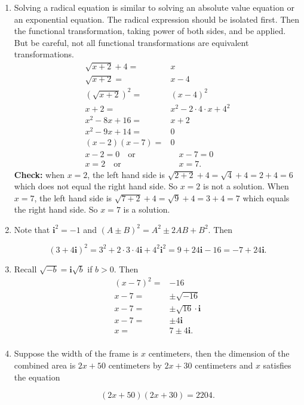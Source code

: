 \documentclass[
  12pt]{article}
\begin{document}
\begin{enumerate}
\def\labelenumi{\arabic{enumi}.}
\setcounter{enumi}{12}
\item
  Solving a radical equation is similar to solving an absolute value
  equation or an exponential equation. The radical expression should be
  isolated first. Then the functional transformation, taking power of
  both sides, and be applied. But be careful, not all functional
  transformations are equivalent transformations. \[
  \begin{aligned}
  \sqrt{x+2}+4=&x\\
  \sqrt{x+2}=&x-4\\
  (\sqrt{x+2})^2=&(x-4)^2\\
  x+2=&x^2-2\cdot 4\cdot x+4^2\\
  x^2-8x+16=&x+2\\
  x^2-9x+14=&0\\
  (x-2)(x-7)=&0\\
  x-2=0\quad\text{or}&\quad x-7=0\\
  x=2\quad\text{or}&\quad x=7.
  \end{aligned}
  \] \textbf{Check:} when \(x=2\), the left hand side is
  \(\sqrt{2+2}+4=\sqrt{4}+4=2+4=6\) which does not equal the right hand
  side. So \(x=2\) is not a solution. When \(x=7\), the left hand side
  is \(\sqrt{7+2}+4=\sqrt{9}+4=3+4=7\) which equals the right hand side.
  So \(x=7\) is a solution.
\item
  Note that \(\mathbf{i}^2=-1\) and \((A\pm B)^2=A^2\pm 2AB+B^2\). Then

  \[(3+4\mathbf{i})^2=3^2+2\cdot 3\cdot 4\mathbf{i}+4^2\mathbf{i}^2=9+24\mathbf{i}-16=-7+24\mathbf{i}.\]
\item
  Recall \(\sqrt{-b}=\mathbf{i}\sqrt{b}\) if \(b>0\). Then \[
  \begin{aligned}
  (x-7)^2=&-16\\
  x-7=&\pm\sqrt{-16}\\
  x-7=&\pm\sqrt{16}\cdot\mathbf{i}\\
  x-7=&\pm4\mathbf{i}\\
  x=&7\pm4\mathbf{i}.\\
  \end{aligned}
  \]
\item
  Suppose the width of the frame is \(x\) centimeters, then the
  dimension of the combined area is \(2x+50\) centimeters by \(2x+30\)
  centimeters and \(x\) satisfies the equation

  \[(2x+50)(2x+30)=2204.\]


\end{enumerate}
\end{document}

